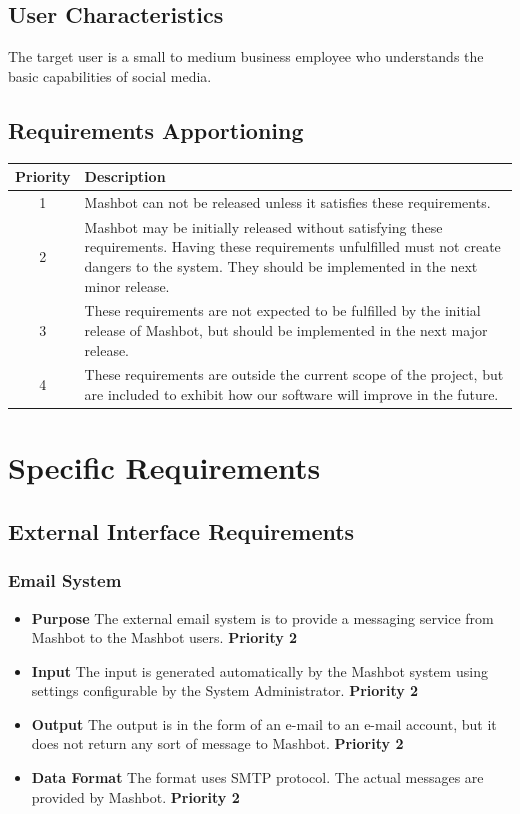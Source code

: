 \documentclass{report}
\begin{document}
\subsection{User Characteristics} %
The target user is a small to medium business employee who understands
the basic capabilities of social media.

\subsection{Requirements Apportioning} %
\begin{tabular}{|c|p{4in}|}
  \hline \textbf{Priority} & \textbf{Description} \\ \hline \hline 1 &
  Mashbot can not be released unless it satisfies these
  requirements. \\ \hline 2 & Mashbot may be initially released
  without satisfying these requirements. Having these requirements
  unfulfilled must not create dangers to the system. They should be
  implemented in the next minor release. \\ \hline 3 & These
  requirements are not expected to be fulfilled by the initial release
  of Mashbot, but should be implemented in the next major
  release. \\ \hline 4 & These requirements are outside the current
  scope of the project, but are included to exhibit how our software
  will improve in the future. \\ \hline
\end{tabular}

\section{Specific Requirements}
\subsection{External Interface Requirements} %
\subsubsection{Email System}
\begin{itemize}
\item \textbf{Purpose} The external email system is to provide a
  messaging service from Mashbot to the Mashbot
  users. \textbf{Priority 2}
\item \textbf{Input} The input is generated automatically by the
  Mashbot system using settings configurable by the System
  Administrator. \textbf{Priority 2}
\item \textbf{Output} The output is in the form of an e-mail to an
  e-mail account, but it does not return any sort of message to
  Mashbot. \textbf{Priority 2}
\item \textbf{Data Format} The format uses SMTP protocol. The actual
  messages are provided by Mashbot. \textbf{Priority 2}
\end{itemize}
\end{document}
